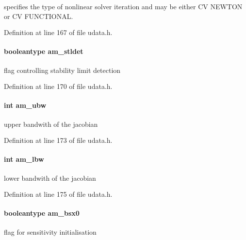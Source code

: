 specifies the type of nonlinear solver iteration and may be either C\+V N\+E\+W\+T\+O\+N or C\+V F\+U\+N\+C\+T\+I\+O\+N\+A\+L. 

Definition at line 167 of file udata.\+h.

\hypertarget{struct_user_data_a7d39c238c319f0164a15744950bfd021}{}
\paragraph[{am\+\_\+stldet}]{\setlength{\rightskip}{0pt plus 5cm}booleantype am\+\_\+stldet}\label{struct_user_data_a7d39c238c319f0164a15744950bfd021}
flag controlling stability limit detection 

Definition at line 170 of file udata.\+h.

\hypertarget{struct_user_data_a7283826ef630f92bb04052eb79a377e5}{}
\paragraph[{am\+\_\+ubw}]{\setlength{\rightskip}{0pt plus 5cm}int am\+\_\+ubw}\label{struct_user_data_a7283826ef630f92bb04052eb79a377e5}
upper bandwith of the jacobian 

Definition at line 173 of file udata.\+h.

\hypertarget{struct_user_data_a0fd271dea83e804c7b1ef82a2b0ab76c}{}
\paragraph[{am\+\_\+lbw}]{\setlength{\rightskip}{0pt plus 5cm}int am\+\_\+lbw}\label{struct_user_data_a0fd271dea83e804c7b1ef82a2b0ab76c}
lower bandwith of the jacobian 

Definition at line 175 of file udata.\+h.

\hypertarget{struct_user_data_a87d2f917b1bea7fea2d5878ccd43c7db}{}
\paragraph[{am\+\_\+bsx0}]{\setlength{\rightskip}{0pt plus 5cm}booleantype am\+\_\+bsx0}\label{struct_user_data_a87d2f917b1bea7fea2d5878ccd43c7db}
flag for sensitivity initialisation

